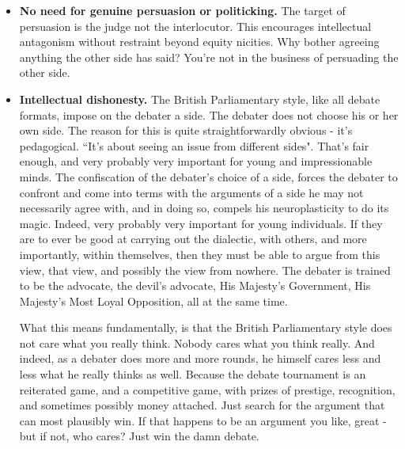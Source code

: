 \begin{itemize}
    



    \item \textbf{No need for genuine persuasion or politicking.} The target of persuasion is the judge not the interlocutor. This encourages intellectual antagonism without restraint beyond equity nicities. Why bother agreeing anything the other side has said? You're not in the business of persuading the other side.
    \item \textbf{Intellectual dishonesty.} The British Parliamentary style, like all debate formats, impose on the debater a side. The debater does not choose his or her own side. The reason for this is quite straightforwardly obvious - it's pedagogical. “It's about seeing an issue from different sides". That's fair enough, and very probably very important for young and impressionable minds. The confiscation of the debater's choice of a side, forces the debater to confront and come into terms with the arguments of a side he may not necessarily agree with, and in doing so, compels his neuroplasticity to do its magic. Indeed, very probably very important for young individuals. If they are to ever be good at carrying out the dialectic, with others, and more importantly, within themselves, then they must be able to argue from this view, that view, and possibly the view from nowhere. The debater is trained to be the advocate, the devil's advocate, His Majesty's Government, His Majesty's Most Loyal Opposition, all at the same time.
    
    What this means fundamentally, is that the British Parliamentary style does not care what you really think. Nobody cares what you think really. And indeed, as a debater does more and more rounds, he himself cares less and less what he really thinks as well. Because the debate tournament is an reiterated game, and a competitive game, with prizes of prestige, recognition, and sometimes possibly money attached. Just search for the argument that can most plausibly win. If that happens to be an argument you like, great - but if not, who cares? Just win the damn debate.



\end{itemize}

